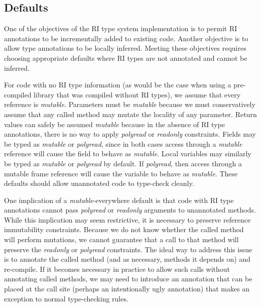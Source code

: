 
\subsection{Defaults}

One of the objectives of the RI type system implementation is to permit
RI annotations to be incrementally added to existing code.
Another objective is to allow type annotations to be locally inferred.
Meeting these objectives requires choosing appropriate defaults
where RI types are not annotated and cannot be inferred.

For code with no RI type information (as would be the case when using a
pre-compiled library that was compiled without RI types),
we assume that every reference is \emph{mutable}.
Parameters must be \emph{mutable} because we must conservatively assume that any called
method may mutate the locality of any parameter.
Return values can safely be assumed \emph{mutable} because in the absence of RI type annotations,
there is no way to apply \emph{polyread} or \emph{readonly} constraints.
Fields may be typed as \emph{mutable} or \emph{polyread}, since in both cases
access through a \emph{mutable} reference will cause the field to behave as \emph{mutable}.
Local variables may similarly be typed as \emph{mutable} or \emph{polyread} by default.
If \emph{polyread}, then access through a mutable frame reference %
will cause the variable to behave as \emph{mutable}.
These defaults should allow unannotated code to type-check cleanly.

One implication of a \emph{mutable}-everywhere default is that code with
RI type annotations cannot pass \emph{polyread} or \emph{readonly} arguments
to unannotated methods.
While this implication may seem restrictive, it is necessary to
preserve reference immutability constraints.
Because we do not know whether the called method will perform mutations,
we cannot guarantee that a call to that method will preserve the
\emph{readonly} or \emph{polyread} constraints.
The ideal way to address this issue is to annotate the called method
(and as necessary, methods it depends on) and re-compile.
If it becomes necessary in practice to allow such calls without
annotating called methods, we may need to introduce an annotation that
can be placed at the call site (perhaps an intentionally ugly annotation)
that makes an exception to normal type-checking rules.

